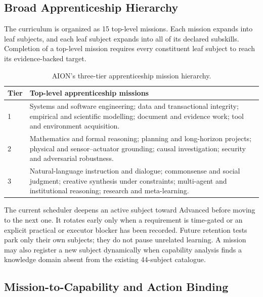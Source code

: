 \subsection{Broad Apprenticeship Hierarchy}
\label{subsec:aion-apprenticeship-hierarchy}

The curriculum is organized as 15 top-level missions.  Each mission expands
into leaf subjects, and each leaf subject expands into all of its declared
subskills.  Completion of a top-level mission requires every constituent leaf
subject to reach its evidence-backed target.

\begin{table}[htbp]
\centering
\caption{AION's three-tier apprenticeship mission hierarchy.}
\label{tab:aion-apprenticeship-hierarchy}
\begin{tabularx}{\textwidth}{@{}p{1.2cm}X@{}}
\toprule
Tier & Top-level apprenticeship missions \\
\midrule
1 & Systems and software engineering; data and transactional integrity;
empirical and scientific modelling; document and evidence work; tool and
environment acquisition. \\
2 & Mathematics and formal reasoning; planning and long-horizon projects;
physical and sensor--actuator grounding; causal investigation; security and
adversarial robustness. \\
3 & Natural-language instruction and dialogue; commonsense and social
judgment; creative synthesis under constraints; multi-agent and institutional
reasoning; research and meta-learning. \\
\bottomrule
\end{tabularx}
\end{table}

The current scheduler deepens an active subject toward Advanced before moving
to the next one.  It rotates early only when a requirement is time-gated or an
explicit practical or executor blocker has been recorded.  Future retention
tests park only their own subjects; they do not pause unrelated learning.  A
mission may also register a new subject dynamically when capability analysis
finds a knowledge domain absent from the existing 44-subject catalogue.

\subsection{Mission-to-Capability and Action Binding}
\label{subsec:aion-mission-action-binding}

